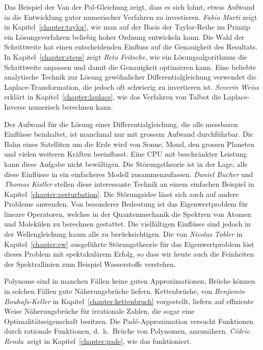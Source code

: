 Das Beispiel der Van der Pol-Gleichung zeigt, dass es sich lohnt,
etwas Aufwand in die Entwicklung guter numerischer Verfahren zu
investieren.
%
{\em Fabio Marti} zeigt in Kapitel~\ref{chapter:taylor}, wie man auf der
Basis der Taylor-Reihe im Prinzip ein Lösungsverfahren beliebig hoher Ordnung 
entwickeln kann.
%
%
Die Wahl der Schrittweite hat einen entscheidenden Einfluss auf die
Genauigkeit des Resultats.
%
In Kapitel~\ref{chapter:steps} zeigt
{\em Reto Fritsche}, wie ein Lösungsalgorithmus die Schrittweite
anpassen und damit die Genauigkeit optimieren kann.
%
Eine beliebte analytische Technik zur Lösung gewöhnlicher Differentialgleichung
verwendet die Laplace-Transformation, die jedoch oft schwierig zu
invertieren ist.
%
%
{\em Severin Weiss} erklärt in Kapitel~\ref{chapter:laplace}, wie 
das Verfahren von Talbot die Laplace-Inverse numerisch berechnen kann.
%

Der Aufwand für die Lösung einer Differentialgleichung, die alle
messbaren Einflüsse beinhaltet, ist manchmal nur mit grossem Aufwand
durchführbar.
Die Bahn eines Satelliten um die Erde wird von Sonne, Mond, den grossen
Planeten und vielen weiteren Kräften beeinflusst.
%
Eine CPU mit beschränkter Leistung kann diese Aufgabe nicht bewältigen.
Die Störungstheorie ist in der Lage, alle diese Einflüsse in ein einfacheres
Modell zusammenzufassen.
%
{\em Daniel Bucher} und {\em Thomas Kistler} stellen diese interessante
Technik an einem einfachen Beispiel in Kapitel~\ref{chapter:perturbation}.
%
%
Die Störungsidee lässt sich auch auf andere Probleme anwenden.
Von besonderer Bedeutung ist das Eigenwertproblem für lineare Operatoren,
welches in der Quantenmechanik die Spektren von Atomen und Molekülen
zu berechnen gestattet.
%
%
%
%
Die vielfältigen Einflüsse sind jedoch in der Wellengleichung kaum
alle zu berücksichtigen.
%
Die von {\em Nicolas Tobler} in Kapitel~\ref{chapter:ew} ausgeführte
Störungstheorie für das Eigenwertproblem löst dieses Problem mit
spektakulärem Erfolg, so dass wir heute auch die Feinheiten der
Spektrallinien zum Beispiel Wasserstoffs verstehen.
%
%

Polynome sind in manchen Fällen keine guten Approximationen,
Brüche können in solchen Fällen gute Näherungsbrüche liefern.
Kettenbrüche, von {\em Benjamin Bouhafs-Keller} in
Kapitel~\ref{chapter:kettenbruch} vorgestellt, liefern auf effiziente
Weise Näherungsbrüche für irrationale Zahlen, die sogar eine
Optimalitätseigenschaft besitzen.
%
%
Die Padé-Approximation versucht Funktionen durch rationale
Funktionen, d.~h.~Brüche von Polynomen, anzunähern.
{\em Cédric Renda} zeigt in Kapitel~\ref{chapter:pade}, wie das
funktioniert.
%
%
%

